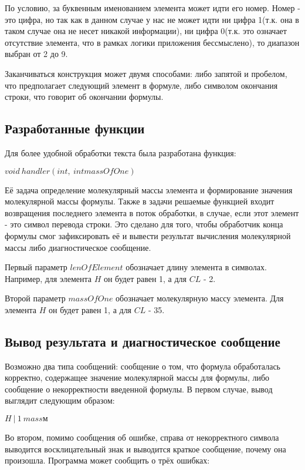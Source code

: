     По условию, за буквенным именованием элемента может идти его номер.
    Номер - это цифра, но так как в данном случае у нас не может идти ни
    цифра 1(т.к. она в таком случае она не несет никакой информации),
    ни цифра 0(т.к. это означает отсутствие элемента, что в рамках логики
    приложения бессмыслено), то диапазон выбран от 2 до 9.
    
    Заканчиваться конструкция может двумя способами: либо запятой и пробелом,
    что предполагает следующий элемент в формуле, либо символом окончания строки,
    что говорит об окончании формулы.

\subsection{Разработанные функции}

    Для более удобной обработки текста была разработана функция:

    $void\ handler(int ,\ int massOfOne)$

    Её задача определение молекулярный массы элемента и формирование
    значения молекулярной массы формулы.
    Также в задачи решаемые функцией входит возвращения последнего элемента
    в поток обработки, в случае, если этот элемент - это символ перевода строки.
    Это сделано для того, чтобы обработчик конца формулы смог зафиксировать её
    и вывести результат вычисления молекулярной массы либо диагностическое сообщение.

    Первый параметр $lenOfElement$ обозначает длину элемента в символах.
    Например, для элемента $H$ он будет равен 1, а для $CL$ - 2.

    Второй параметр $massOfOne$ обозначает молекулярную массу элемента.
    Для элемента $H$ он будет равен 1, а для $CL$ - 35.
    

\subsection{Вывод результата и диагностическое сообщение}

    Возможно два типа сообщений: сообщение о том, что формула обработалась корректно,
    содержащее значение молекулярной массы для формулы, либо сообщение о некорректности
    введенной формулы. В первом случае, вывод выглядит следующим образом:

    $H\ |\ 1\ massм$

    Во втором, помимо сообщения об ошибке, справа от некорректного символа выводится
    восклицательный знак и выводится краткое сообщение, почему она произошла.
    Программа может сообщить о трёх ошибках:

